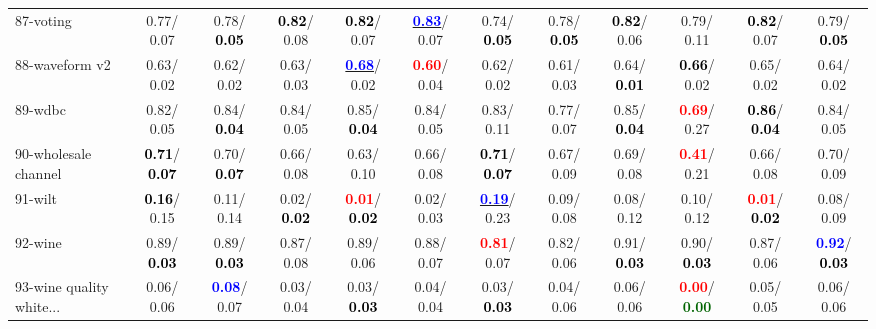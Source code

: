 \begin{table}[h]
\begin{center}
{\begin{tabular}{lc|c|c|c|c|c|c|c|c|c|c}
87-voting &   0.77/  0.07 &   0.78/\textcolor{black}{\textbf{  0.05}} & \textcolor{black}{\textbf{  0.82}}/  0.08 & \textcolor{black}{\textbf{  0.82}}/  0.07 & \underline{\textcolor{blue}{\textbf{  0.83}}}/  0.07 &   0.74/\textcolor{black}{\textbf{  0.05}} &   0.78/\textcolor{black}{\textbf{  0.05}} & \textcolor{black}{\textbf{  0.82}}/  0.06 &   0.79/  0.11 & \textcolor{black}{\textbf{  0.82}}/  0.07 &   0.79/\textcolor{black}{\textbf{  0.05}} \\
88-waveform v2 &   0.63/  0.02 &   0.62/  0.02 &   0.63/  0.03 & \underline{\textcolor{blue}{\textbf{  0.68}}}/  0.02 & \textcolor{red}{\textbf{  0.60}}/  0.04 &   0.62/  0.02 &   0.61/  0.03 &   0.64/\textcolor{black}{\textbf{  0.01}} & \textcolor{black}{\textbf{  0.66}}/  0.02 &   0.65/  0.02 &   0.64/  0.02 \\
89-wdbc &   0.82/  0.05 &   0.84/\textcolor{black}{\textbf{  0.04}} &   0.84/  0.05 &   0.85/\textcolor{black}{\textbf{  0.04}} &   0.84/  0.05 &   0.83/  0.11 &   0.77/  0.07 &   0.85/\textcolor{black}{\textbf{  0.04}} & \textcolor{red}{\textbf{  0.69}}/  0.27 & \textcolor{black}{\textbf{  0.86}}/\textcolor{black}{\textbf{  0.04}} &   0.84/  0.05 \\
90-wholesale channel & \textcolor{black}{\textbf{  0.71}}/\textcolor{black}{\textbf{  0.07}} &   0.70/\textcolor{black}{\textbf{  0.07}} &   0.66/  0.08 &   0.63/  0.10 &   0.66/  0.08 & \textcolor{black}{\textbf{  0.71}}/\textcolor{black}{\textbf{  0.07}} &   0.67/  0.09 &   0.69/  0.08 & \textcolor{red}{\textbf{  0.41}}/  0.21 &   0.66/  0.08 &   0.70/  0.09 \\
91-wilt & \textcolor{black}{\textbf{  0.16}}/  0.15 &   0.11/  0.14 &   0.02/\textcolor{black}{\textbf{  0.02}} & \textcolor{red}{\textbf{  0.01}}/\textcolor{black}{\textbf{  0.02}} &   0.02/  0.03 & \underline{\textcolor{blue}{\textbf{  0.19}}}/  0.23 &   0.09/  0.08 &   0.08/  0.12 &   0.10/  0.12 & \textcolor{red}{\textbf{  0.01}}/\textcolor{black}{\textbf{  0.02}} &   0.08/  0.09 \\
92-wine &   0.89/\textcolor{black}{\textbf{  0.03}} &   0.89/\textcolor{black}{\textbf{  0.03}} &   0.87/  0.08 &   0.89/  0.06 &   0.88/  0.07 & \textcolor{red}{\textbf{  0.81}}/  0.07 &   0.82/  0.06 &   0.91/\textcolor{black}{\textbf{  0.03}} &   0.90/\textcolor{black}{\textbf{  0.03}} &   0.87/  0.06 & \textcolor{blue}{\textbf{  0.92}}/\textcolor{black}{\textbf{  0.03}} \\ \hline
93-wine quality white... &   0.06/  0.06 & \textcolor{blue}{\textbf{  0.08}}/  0.07 &   0.03/  0.04 &   0.03/\textcolor{black}{\textbf{  0.03}} &   0.04/  0.04 &   0.03/\textcolor{black}{\textbf{  0.03}} &   0.04/  0.06 &   0.06/  0.06 & \textcolor{red}{\textbf{  0.00}}/\textcolor{darkgreen}{\textbf{  0.00}} &   0.05/  0.05 &   0.06/  0.06 \\

\end{tabular}}
\end{center}
\end{table}
